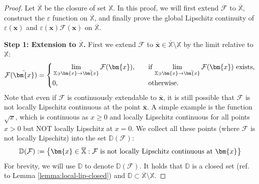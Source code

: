 \documentclass{amsart} %
\def\vx{{\bm{x}}}
\def\sD{{\mathbb{D}}}
\def\sX{{\mathbb{X}}}
\def\cF{{\mathcal{F}}}
\theoremstyle{definition}
\theoremstyle{remark}
\begin{document}
\begin{proof} Let $\overline{\sX}$ be the closure of set $\sX$. In this proof, we will first extend $\cF$ to $\overline{\sX}$, construct the $\varepsilon$ function on $\overline{\sX}$, and finally prove the global Lipschitz continuity of $\varepsilon(\vx)$ and $\varepsilon(\vx) \cF(\vx)$ on $\overline{\sX}$.


\textbf{Step 1: Extension to $\overline{\sX}$.} First we extend $\cF$ to $\bar \vx \in \overline{\sX} \setminus \sX$ by the limit relative to $\sX$:
\[
\cF(\bar \vx )=\left\{
\begin{aligned}
    & \lim_{\sX\ni \vx\to\bar \vx}\cF(\vx),  \quad &&  \textup{if $\lim_{\sX\ni \vx\to\bar \vx}\cF(\vx)$ exists}, \\
& 0,  && \textup{otherwise}.
\end{aligned}\right.
\]
Note that even if $\cF$ is continuously extendable to $\bar \vx$, it is still possible that $\cF$ is not locally Lipschitz continuous at the point $\bar \vx$. A simple example is the function $\sqrt{x}$, which is continuous as $x\geq 0$ and locally Lipschitz continuous for all points $x >0$ but NOT locally Lipschitz at $x=0$. We collect all these points (where $\cF$ is not locally Lipschitz) into the set $\sD(\cF)$:
\[ \sD(\cF):= \left\{ \vx \in \overline{\sX}: \textup{$\cF$ is not locally Lipschitz continuous at $\vx$} \right\} \]
For brevity, we will use $\sD$ to denote $\sD(\cF)$. It holds that $\sD$ is a closed set (ref. to Lemma \ref{lemma:local-lip-closed}) and $\sD \subset \overline{\sX}\setminus\sX$.
    

\end{proof}
\end{document}
